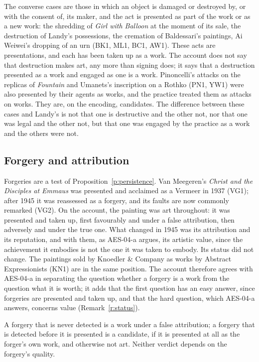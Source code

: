 \documentclass{situationist-preprint}
\begin{document}
The converse cases are those in which an object is damaged or destroyed by, or with the consent of, its maker, and the act is presented as part of the work or as a new work: the shredding of \emph{Girl with Balloon} at the moment of its sale, the destruction of Landy's possessions, the cremation of Baldessari's paintings, Ai Weiwei's dropping of an urn (BK1, ML1, BC1, AW1). These acts are presentations, and each has been taken up as a work. The account does not say that destruction makes art, any more than signing does; it says that a destruction presented as a work and engaged as one is a work. Pinoncelli's attacks on the replicas of \emph{Fountain} and Umanets's inscription on a Rothko (PN1, YW1) were also presented by their agents as works, and the practice treated them as attacks on works. They are, on the encoding, candidates. The difference between these cases and Landy's is not that one is destructive and the other not, nor that one was legal and the other not, but that one was engaged by the practice as a work and the others were not.

\subsection{Forgery and attribution}

Forgeries are a test of Proposition~\ref{p:persistence}. Van Meegeren's \emph{Christ and the Disciples at Emmaus} was presented and acclaimed as a Vermeer in 1937 (VG1); after 1945 it was reassessed as a forgery, and its faults are now commonly remarked (VG2). On the account, the painting was art throughout: it was presented and taken up, first favourably and under a false attribution, then adversely and under the true one. What changed in 1945 was its attribution and its reputation, and with them, as AES-04-a argues, its artistic value, since the achievement it embodies is not the one it was taken to embody. Its status did not change. The paintings sold by Knoedler \& Company as works by Abstract Expressionists (KN1) are in the same position. The account therefore agrees with AES-04-a in separating the question whether a forgery is a work from the question what it is worth; it adds that the first question has an easy answer, since forgeries are presented and taken up, and that the hard question, which AES-04-a answers, concerns value (Remark~\ref{r:status}).

A forgery that is never detected is a work under a false attribution; a forgery that is detected before it is presented is a candidate, if it is presented at all as the forger's own work, and otherwise not art. Neither verdict depends on the forgery's quality.
\end{document}

